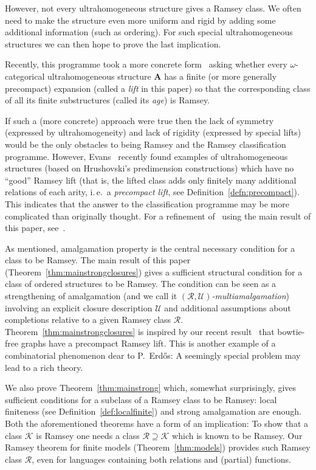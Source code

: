 \documentclass{elsarticle}
\newcommand{\ie}{i.\,e.}
\def\str#1{\mathbf {#1}}
\theoremstyle{plain}
\theoremstyle{definition}
\theoremstyle{remark}
\begin{document}
However, not every ultrahomogeneous structure gives a Ramsey class. We often need to make the structure even more uniform and rigid by adding some additional information (such as ordering).
For such special ultrahomogeneous structures we can then hope to prove the last implication.

Recently, this programme took a more concrete form~\cite{Bodirsky2011a,The2013b,Melleray2015} asking whether every $\omega$-categorical ultrahomogeneous structure $\str{A}$ has a finite (or more generally precompact) expansion (called a \emph{lift} in this paper) so that the corresponding class of all its finite substructures (called its \emph{age}) is Ramsey.

If such a (more concrete) approach were true then the lack of symmetry (expressed by ultrahomogeneity) and lack of rigidity (expressed by special lifts) would be the only obstacles to being Ramsey and the Ramsey classification programme.
However, Evans~\cite{Evans} recently found examples of ultrahomogeneous structures (based on Hrushovski's predimension constructions) which have no ``good'' Ramsey lift
(that is, the lifted class  adds only finitely many additional relations of each arity, \ie{}\ a \emph{precompact lift}, see Definition~\ref{defn:precompact}).  This indicates that the answer to the classification programme  may be more complicated than originally thought. For a refinement of~\cite{Evans} using the main result of this paper, see~\cite{Evans2}.

\medskip

As mentioned, amalgamation property is the central necessary condition for a class to be Ramsey.
The main result of this paper (Theorem~\ref{thm:mainstrongclosures}) gives a sufficient structural
condition for a class of ordered structures to be Ramsey. The
condition can be seen as a strengthening of amalgamation (and we call it \emph{$(\mathcal
R,\mathcal U)$-multiamalgamation}) involving an explicit closure description $\mathcal U$ and additional assumptions about completions relative to a given Ramsey class $\mathcal R$. 
Theorem~\ref{thm:mainstrongclosures} is inspired by our recent result~\cite{Hubivcka2014} that bowtie-free graphs have a precompact Ramsey lift.
This is another example of a combinatorial phenomenon dear to P.~Erd\H os: A seemingly special problem may lead to a rich theory.

We also prove Theorem~\ref{thm:mainstrong} which, somewhat surprisingly, gives sufficient conditions for a subclass of a Ramsey class to be Ramsey: local finiteness (see Definition~\ref{def:localfinite}) and strong amalgamation are enough.
Both the aforementioned theorems have a form of an implication: To show that a class $\mathcal K$ is Ramsey one needs a class $\mathcal R\supseteq \mathcal K$ which is known to be Ramsey.
Our Ramsey theorem for finite models (Theorem~\ref{thm:models}) provides such Ramsey class $\mathcal R$, even for languages containing both relations and (partial) functions.
\medskip
\end{document}
